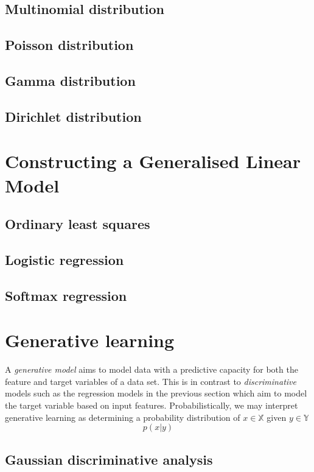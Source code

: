 \documentclass{article}
\theoremstyle{definition}
\theoremstyle{remark}
\begin{document}
\subsection{Multinomial distribution}
\subsection{Poisson distribution}
\subsection{Gamma distribution}
\subsection{Dirichlet distribution}

\section{Constructing a Generalised Linear Model}
\subsection{Ordinary least squares}
\subsection{Logistic regression}
\subsection{Softmax regression}

\section{Generative learning}
A \textit{generative model} aims to model data with a predictive capacity for both the feature and target variables of a data set. This is in contrast to \textit{discriminative} models such as the regression models in the previous section which aim to model the target variable based on input features.
Probabilistically, we may interpret generative learning as determining a probability distribution of $x\in \mathbb{X}$ given $y\in\mathbb{Y}$
\begin{equation}
  p(x|y)
  \label{eqn:generativelearning}
\end{equation}


\subsection{Gaussian discriminative analysis}
\end{document}
